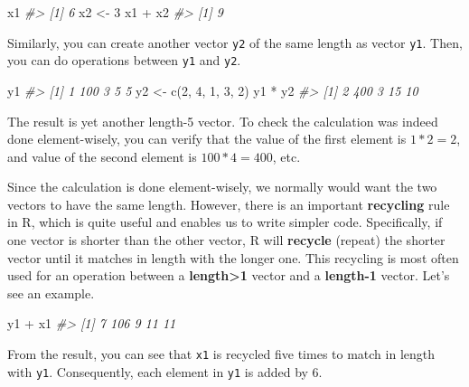 \documentclass[
]{book}
\newenvironment{Shaded}{\begin{snugshade}}{\end{snugshade}}
\newcommand{\CommentTok}[1]{\textcolor[rgb]{0.56,0.35,0.01}{\textit{#1}}}
\newcommand{\DecValTok}[1]{\textcolor[rgb]{0.00,0.00,0.81}{#1}}
\newcommand{\FunctionTok}[1]{\textcolor[rgb]{0.00,0.00,0.00}{#1}}
\newcommand{\NormalTok}[1]{#1}
\newcommand{\OtherTok}[1]{\textcolor[rgb]{0.56,0.35,0.01}{#1}}
\newcommand{\SpecialCharTok}[1]{\textcolor[rgb]{0.00,0.00,0.00}{#1}}
\begin{document}
\begin{Shaded}
\begin{Highlighting}[]
\NormalTok{x1}
\CommentTok{\#\textgreater{} [1] 6}
\NormalTok{x2 }\OtherTok{\textless{}{-}} \DecValTok{3}
\NormalTok{x1 }\SpecialCharTok{+}\NormalTok{ x2}
\CommentTok{\#\textgreater{} [1] 9}
\end{Highlighting}
\end{Shaded}

Similarly, you can create another vector \texttt{y2} of the same length as vector \texttt{y1}. Then, you can do operations between \texttt{y1} and \texttt{y2}.

\begin{Shaded}
\begin{Highlighting}[]
\NormalTok{y1}
\CommentTok{\#\textgreater{} [1]   1 100   3   5   5}
\NormalTok{y2 }\OtherTok{\textless{}{-}} \FunctionTok{c}\NormalTok{(}\DecValTok{2}\NormalTok{, }\DecValTok{4}\NormalTok{, }\DecValTok{1}\NormalTok{, }\DecValTok{3}\NormalTok{, }\DecValTok{2}\NormalTok{)}
\NormalTok{y1 }\SpecialCharTok{*}\NormalTok{ y2}
\CommentTok{\#\textgreater{} [1]   2 400   3  15  10}
\end{Highlighting}
\end{Shaded}

The result is yet another length-5 vector. To check the calculation was indeed done element-wisely, you can verify that the value of the first element is \(1 * 2 = 2\), and value of the second element is \(100 * 4 = 400\), etc.

Since the calculation is done element-wisely, we normally would want the two vectors to have the same length. However, there is an important \textbf{recycling} rule in R, which is quite useful and enables us to write simpler code. Specifically, if one vector is shorter than the other vector, R will \textbf{recycle} (repeat) the shorter vector until it matches in length with the longer one. This recycling is most often used for an operation between a \textbf{length\textgreater1} vector and a \textbf{length-1} vector. Let's see an example.

\begin{Shaded}
\begin{Highlighting}[]
\NormalTok{y1 }\SpecialCharTok{+}\NormalTok{ x1}
\CommentTok{\#\textgreater{} [1]   7 106   9  11  11}
\end{Highlighting}
\end{Shaded}

From the result, you can see that \texttt{x1} is recycled five times to match in length with \texttt{y1}. Consequently, each element in \texttt{y1} is added by 6.
\end{document}

